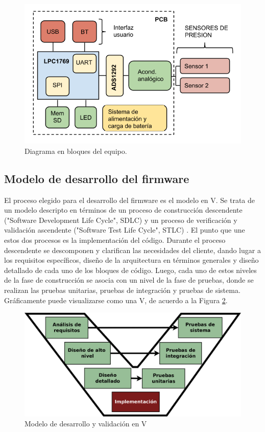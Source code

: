 \begin{figure}[!htbp]
	\centering
	\includegraphics[width=\textwidth]{./Figures/diag_bloques.png}
	\caption{Diagrama en bloques del equipo.}
	\label{fig:diag_bloques}
\end{figure}

\subsection{Modelo de desarrollo del firmware}


El proceso elegido para el desarrollo del firmware es el modelo en V. Se trata de un modelo descripto en términos de un proceso de construcción descendente ("Software Development Life Cycle", SDLC) y un proceso de verificación y validación ascendente ("Software Test Life Cycle", STLC) \citep{fowler2015}. El punto que une estos dos procesos es la implementación del código. 
Durante el proceso descendente se descomponen y clarifican las necesidades del cliente, dando lugar a los requisitos específicos, diseño de la arquitectura en términos generales y diseño detallado de cada uno de los bloques de código. Luego, cada uno de estos niveles de la fase de construcción se asocia con un nivel de la fase de pruebas, donde se realizan las pruebas unitarias, pruebas de integración y pruebas de sistema. Gráficamente puede visualizarse como una V, de acuerdo a la Figura \ref{fig:modeloV}.

\begin{figure}[!htbp]
	\centering
	\includegraphics[width=\textwidth]{./Figures/modeloV.png}
	\caption{Modelo de desarrollo y validación en V}
	\label{fig:modeloV}
\end{figure}

